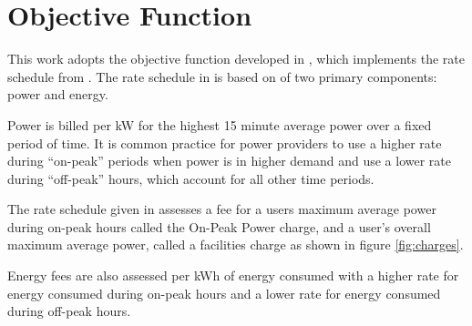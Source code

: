 \section{Objective Function\label{sec:objective}}
This work adopts the objective function developed in \cite{mortensen_comprehensive_2021}, which implements the rate schedule from \cite{rocky_mountain_power_rocky_2021}. The rate schedule in \cite{rocky_mountain_power_rocky_2021} is based on of two primary components: power and energy.  
\par Power is billed per kW for the highest 15 minute average power over a fixed period of time. It is common practice for power providers to use a higher rate during ``on-peak'' periods when power is in higher demand and use a lower rate during ``off-peak'' hours, which account for all other time periods. 
\par The rate schedule given in \cite{rocky_mountain_power_rocky_2021} assesses a fee for a users maximum average power during on-peak hours called the On-Peak Power charge, and a user's overall maximum average power, called a facilities charge as shown in figure \ref{fig:charges}. 
\par Energy fees are also assessed per kWh of energy consumed with a higher rate for energy consumed during on-peak hours and a lower rate for energy consumed during off-peak hours.

